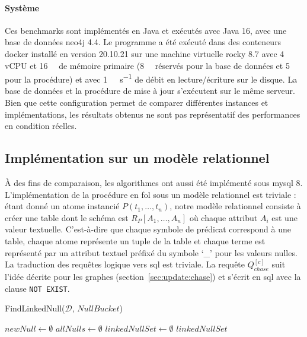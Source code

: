\paragraph{Système}
Ces benchmarks sont implémentés en Java et exécutés avec {Java 16}, avec une base de données \gls{neo4j} 4.4.
Le programme a été exécuté dans des conteneurs \gls{docker} installé en version 20.10.21 sur une machine virtuelle \gls{rocky} 8.7 avec \num{4} vCPU et \SI{16}{\giga\byte} de mémoire primaire (\SI{8}{\giga\byte} réservés pour la base de données et \SI{5}{\giga\byte} pour la procédure) et avec \SI{1}{\giga\byte\per\second} de débit en lecture/écriture sur le disque.
La base de données et la procédure de mise à jour s'exécutent sur le même serveur.
Bien que cette configuration permet de comparer différentes instances et implémentations, les résultats obtenus ne sont pas représentatif des performances en condition réelles.

\subsection{Implémentation sur un modèle relationnel}
\label{sec:update:evaluation:mysql}
À des fins de comparaison, les algorithmes ont aussi été implémenté sous \gls{mysql} 8.
L'implémentation de la procédure en \gls{fol} sous un modèle relationnel est triviale : étant donné un atome instancié $P(t_1, \dots, t_n)$, notre modèle relationnel consiste à créer une table dont le schéma est $R_P[A_1, \dots, A_n]$ où chaque attribut $A_i$ est une valeur textuelle.
C'est-à-dire que chaque symbole de prédicat correspond à une table, chaque atome représente un tuple de la table et chaque terme est représenté par un attribut textuel préfixé du symbole `\_' pour les valeurs nulles.
La traduction des requêtes logique vers \gls{sql} est triviale.
La requête $Q_{chase}^{[c]}$ suit l'idée décrite pour les graphes (section~\ref{sec:update:chase}) et s'écrit en \gls{sql} avec la clause \verb|NOT EXIST|.

\begin{procedure}[htb]
	\caption{FindLinkedNull($\mathcal{D}$, $NullBucket$)}
    \label{algo:update:mysql:partition}

	$newNull \gets \emptyset$ \;
    $allNulls \gets \emptyset$ \;
    $linkedNullSet \gets \emptyset$ \;
	\Return $linkedNullSet$ \;
\end{procedure}


